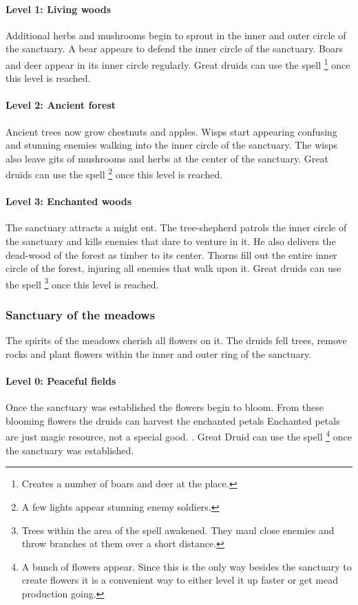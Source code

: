 \documentclass[a4paper]{book}
\begin{document}
			\paragraph{Level 1: Living woods}
				Additional herbs and mushrooms begin to sprout in the inner and outer circle
				of the sanctuary.
				A bear appears to defend the inner circle of the sanctuary.
				Boars and deer appear in its inner circle regularly.
				Great druids can use the spell \footnote{
					Creates a number of boars and deer at the place.
				} once this level is reached.

			\paragraph{Level 2: Ancient forest}
				Ancient trees now grow chestnuts and apples.
				Wisps start appearing confusing and stunning enemies walking into the inner circle
				of the sanctuary.
				The wisps also leave gits of mushrooms and herbs at the center of the sanctuary.
				Great druids can use the spell \footnote{
					A few lights appear stunning enemy soldiers.
				} once this level is reached.

			\paragraph{Level 3: Enchanted woods}
				The sanctuary attracts a might ent.
				The tree-shepherd patrols the inner circle of the sanctuary
				and kills enemies that dare to venture in it.
				He also delivers the dead-wood of the forest as timber to its center.
				Thorns fill out the entire inner circle of the forest,
				injuring all enemies that walk upon it.
				Great druids can use the spell \footnote{
					Trees within the area of the spell awakened.
					They maul close enemies and throw branches at them over a short distance.
				} once this level is reached.

		\subsubsection{Sanctuary of the meadows}
			The spirits of the meadows cherish all flowers on it.
			The druids fell trees, remove rocks and plant flowers
			within the inner and outer ring of the sanctuary.

			\paragraph{Level 0: Peaceful fields}
				Once the sanctuary was established the flowers begin to bloom.
				From these blooming flowers the druids can harvest the enchanted petals{
					Enchanted petals are just magic resource, not a special good.
				}.
				Great Druid can use the spell \footnote{
					A bunch of flowers appear.
					Since this is the only way besides the sanctuary to create flowers
					it is a convenient way to either level it up faster or
					get mead production going.
				} once the sanctuary was established.
\end{document}
